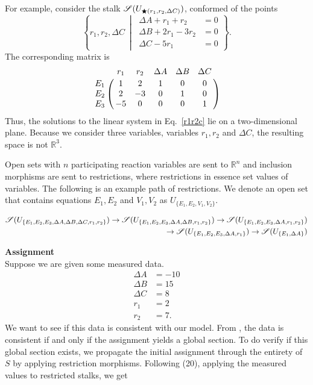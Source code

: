 \documentclass{article}
\begin{document}
For example, consider the stalk $\mathscr{S}(U_{\bigstar(r_1, r_2, \Delta C)})$,
conformed of the points
\begin{equation} 
	\left\{r_1, r_2, \Delta C \: \middle| \:
	\begin{split}  
	 \Delta A + r_1 + r_2  &= 0 \\
	 \Delta B +2r_1 - 3r_2  &= 0 \\
	 \Delta C - 5r_1 &= 0
	\end{split}
	\right\}.
\label{r1r2c}
\end{equation}
The corresponding matrix is
\begin{equation} 
\bordermatrix{
~   & r_1 & r_2 & \Delta A & \Delta B & \Delta C \cr
E_1 & 1  & 2    & 1 & 0 & 0 \cr
E_2 & 2  & -3   & 0 & 1 & 0 \cr
E_3 & -5  & 0    & 0 & 0 & 1 \cr
}
\end{equation}
Thus, the solutions to the linear system in Eq.~\ref{r1r2c} lie on a
two-dimensional plane. Because we consider three variables, variables $r_1,
r_2$ and $\Delta C$, the resulting space is not $\mathbb{R}^3$.

Open sets with $n$ participating reaction variables are sent to $\mathbb{R}^n$
and inclusion morphisms are sent to restrictions, where restrictions in essence
set values of variables. The following is an example path of restrictions. We
denote an open set that contains equations $E_1, E_2$ and $V_1, V_2$ as
$U_{\{E_1,E_2,V_1,V_2\}}$.

\begin{align}
	\mathscr{S}(U_{\{E_1, E_2, E_3, \Delta A, \Delta B, \Delta C, r_1, r_2\}}) \to 
	\mathscr{S}(U_{\{E_1, E_2, E_3, \Delta A, \Delta B, r_1, r_2\}}) \to \mathscr{S}(U_{\{E_1, 
	E_2, E_3, \Delta A, r_1, r_2\}}) \\
	\to 
	\mathscr{S}(U_{\{E_1, E_2, E_3, \Delta 
	A, r_1\}})
	\to 
	\mathscr{S}(U_{\{E_1, \Delta A\}})
\end{align}


\textbf{Assignment}\\
Suppose we are given some measured data.
\begin{align*}
\Delta A &= -10 \\
\Delta B &= 15 \\
\Delta C &= 8 \\
r_1 &= 2 \\
r_2 &= 7.
\end{align*}
We want to see if this data is consistent with our model. From , the data is consistent if and only if the assignment yields a global 
section. To do verify if this global section exists, we propagate the initial 
assignment through the entirety of $S$ by applying restriction morphisms.
Following (20), applying the measured values to restricted stalks, we get 
\end{document}
